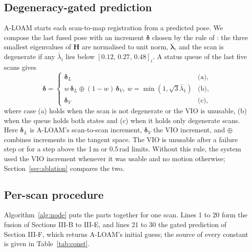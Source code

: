 \documentclass[journal]{IEEEtran}
\begin{document}
\subsection{Degeneracy-gated prediction}
A-LOAM starts each scan-to-map registration from a predicted pose. We compose the last fused pose with an increment $\boldsymbol\delta$ chosen by the rule of \cite{switchslam2024}: the three smallest eigenvalues of $\mathbf H$ are normalised to unit norm, $\bar{\boldsymbol\lambda}$, and the scan is degenerate if any $\bar\lambda_i$ lies below $[0.12,\,0.27,\,0.48]_i$. A status queue of the last five scans gives
\begin{equation}
\boldsymbol\delta=\begin{cases}
\boldsymbol\delta_L & \text{(a)},\\
w\,\boldsymbol\delta_L\oplus(1-w)\,\boldsymbol\delta_V,\ w=\min(1,\sqrt3\bar\lambda_1) & \text{(b)},\\
\boldsymbol\delta_V & \text{(c)},
\end{cases}
\end{equation}
where case (a) holds when the scan is not degenerate or the VIO is unusable, (b) when the queue holds both states and (c) when it holds only degenerate scans. Here $\boldsymbol\delta_L$ is A-LOAM's scan-to-scan increment, $\boldsymbol\delta_V$ the VIO increment, and $\oplus$ combines increments in the tangent space. The VIO is unusable after a failure step or for a step above the 1\,m or 0.5\,rad limits. Without this rule, the system used the VIO increment whenever it was usable and no motion otherwise; Section~\ref{sec:ablation} compares the two.

\subsection{Per-scan procedure}
Algorithm~\ref{alg:node} puts the parts together for one scan. Lines 1 to 20 form the fusion of Sections III-B to III-E, and lines 21 to 30 the gated prediction of Section III-F, which returns A-LOAM's initial guess; the source of every constant is given in Table~\ref{tab:const}.
\end{document}
